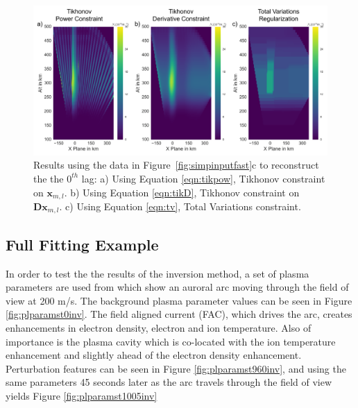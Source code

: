 \begin{figure}[!ht]
\centering
\includegraphics[width=6in]{Simpleinvertedfaster}
\caption{Results using the data in Figure~\ref{fig:simpinputfast}c to reconstruct the the $0^{th}$ lag: a) Using Equation \ref{eqn:tikpow}, Tikhonov constraint on $\mathbf{x}_{m,l}$.  b) Using Equation \ref{eqn:tikD}, Tikhonov constraint on $\mathbf{Dx}_{m,l}$. c) Using Equation \ref{eqn:tv}, Total Variations constraint.}
\label{fig:simpoutputfast}
\end{figure}

\subsection{Full Fitting Example}

In order to test the the results of the inversion method, a set of plasma parameters are used from \citet{Perry:2015jf} which show an auroral arc moving through the field of view at 200 m/s. The background plasma parameter values can be seen in Figure \ref{fig:plparamst0inv}. The field aligned current (FAC), which drives the arc, creates enhancements in electron density, electron and ion temperature. Also of importance is the plasma cavity which is co-located with the ion temperature enhancement and slightly ahead of the electron density enhancement. Perturbation features can be seen in Figure \ref{fig:plparamst960inv}, and using the same parameters 45 seconds later as the arc travels through the field of view yields Figure \ref{fig:plparamst1005inv}

